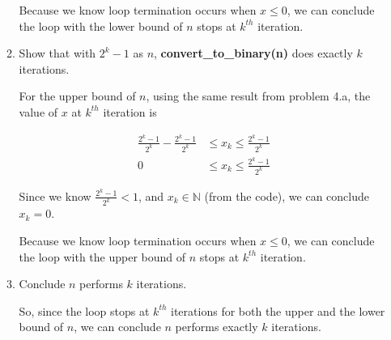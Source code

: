 \documentclass[12pt]{article}
\begin{document}
\begin{enumerate}[a.]
\begin{mdframed}
\begin{enumerate}[1.]
\begin{mdframed}
            \bigskip

            Because we know loop termination occurs when $x \leq 0$, we can conclude
            the loop with the lower bound of $n$ stops at $k^{th}$ iteration.

            \end{mdframed}

            \bigskip

            \item Show that with $2^k - 1$ as $n$, \textbf{convert\_to\_binary(n)}
            does exactly $k$ iterations.

            \bigskip

            \begin{mdframed}
            For the upper bound of $n$, using the same result from problem 4.a,
            the value of $x$ at $k^{th}$ iteration is

            \bigskip

            \begin{align}
                \frac{2^k - 1}{2^k} - \frac{2^k - 1}{2^k} &\leq x_k \leq \frac{2^k - 1}{2^k}\\
                0 &\leq x_k \leq \frac{2^k - 1}{2^k}
            \end{align}

            \bigskip

            Since we know $\frac{2^k - 1}{2^k} < 1$, and $x_k \in \mathbb{N}$ (from the code),
            we can conclude $x_k = 0$.

            \bigskip

            Because we know loop termination occurs when $x \leq 0$, we can conclude
            the loop with the upper bound of $n$ stops at $k^{th}$ iteration.

            \end{mdframed}

            \item Conclude $n$ performs $k$ iterations.

            \bigskip

            \begin{mdframed}
            So, since the loop stops at $k^{th}$ iterations for both the upper
            and the lower bound of $n$, we can conclude $n$ performs exactly
            $k$ iterations.
            \end{mdframed}

        \end{enumerate}


\end{mdframed}
\end{enumerate}
\end{document}
